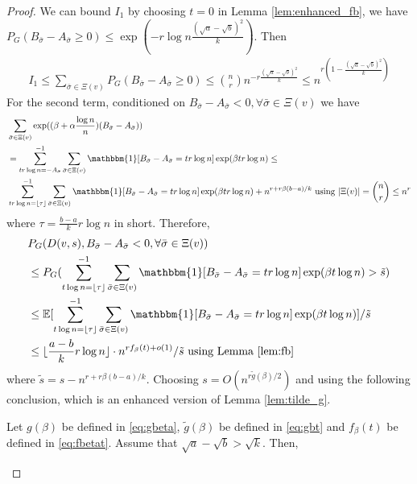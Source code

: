\documentclass{article}
\begin{document}
\begin{proof}
We can bound $I_1$ by choosing $t=0$ in Lemma \ref{lem:enhanced_fb}, we have
$P_G( B_{\bar{\sigma}} - A_{\bar{\sigma}} \ge 0 ) \leq \exp(-r\log n \frac{(\sqrt{a}-\sqrt{b})^2}{k})$.
Then
\begin{align*}
I_1 \leq \sum_{\bar{\sigma} \in \Xi(v)} P_G( B_{\bar{\sigma}} - A_{\bar{\sigma}} \geq 0) \leq \binom{n}{r} n^{-r\frac{(\sqrt{a}-\sqrt{b})^2}{k}}
\leq n^{r(1-\frac{(\sqrt{a}-\sqrt{b})^2}{k})}
\end{align*}
For the second term,
conditioned on $B_{\bar{\sigma}} - A_{\bar{\sigma}}    < 0, \forall \bar{\sigma} \in \Xi(v)$ we have
\begin{align*}
&\sum_{\bar{\sigma} \in \Xi(v)} \exp ( (\beta + \alpha \frac{\log n}{n})(B_{\bar{\sigma}} - A_{\bar{\sigma}} ) ) \\
& = \sum_{tr\log n = -A_{\bar{\sigma}} }^{-1} \sum_{\bar{\sigma} \in \Xi(v)} \mathbbm{1}[B_{\bar{\sigma}} - A_{\bar{\sigma}}  = tr \log n] \exp ( \beta  tr\log n)\leq \\ 
&
\sum_{tr\log n =\lfloor\tau\rfloor}^{-1} \sum_{\bar{\sigma} \in \Xi(v)}  \mathbbm{1}[B_{\bar{\sigma}} - A_{\bar{\sigma}}  = tr \log n]
\exp ( \beta  tr\log n) + n^{r+r\beta(b-a)/k} \textrm{ using } |\Xi(v)| = \binom{n}{r} \leq n^r
\end{align*}
where $\tau =\frac{b-a}{k}r\log n$ in short. Therefore,
\begin{align*}
&P_G(D(v,s), B_{\bar{\sigma}} - A_{\bar{\sigma}}  < 0, \forall \bar{\sigma} \in \Xi(v))  \\
&\leq P_G(\sum_{t\log n =\lfloor\tau\rfloor}^{-1}\sum_{\bar{\sigma} \in \Xi(v)} \mathbbm{1}[B_{\bar{\sigma}} - A_{\bar{\sigma}} = tr\log n]\exp ( \beta  t\log n)  > \tilde{s} ) \\
& \leq \mathbb{E}[\sum_{t\log n =\lfloor\tau\rfloor}^{-1}\sum_{\bar{\sigma} \in \Xi(v)} \mathbbm{1}[B_{\bar{\sigma}} - A_{\bar{\sigma}} = tr\log n]\exp ( \beta  t\log n)] /  \tilde{s} \\
& \leq \lfloor\frac{a-b}{k}r\log n\rfloor \cdot n^{rf_{\beta}(t) + o(1)} / \tilde{s} \textrm{ using Lemma \ref{lem:fb} }
\end{align*}
where $\tilde{s} = s - n^{r+r\beta(b-a)/k}$. 
Choosing $s = O(n^{r\tilde{g}(\beta)/2})$ and using the following conclusion, which is an enhanced version of Lemma
\ref{lem:tilde_g}.
\begin{lemma} \label{lm:ele}
Let $g(\beta)$ be defined in \eqref{eq:gbeta}, $\tilde{g}(\beta)$ be defined in \eqref{eq:gbt} and $f_{\beta}(t)$ be defined in \eqref{eq:fbetat}. Assume that $\sqrt{a}-\sqrt{b}>\sqrt{k}$.
Then,


\end{lemma}
\end{proof}
\end{document}
